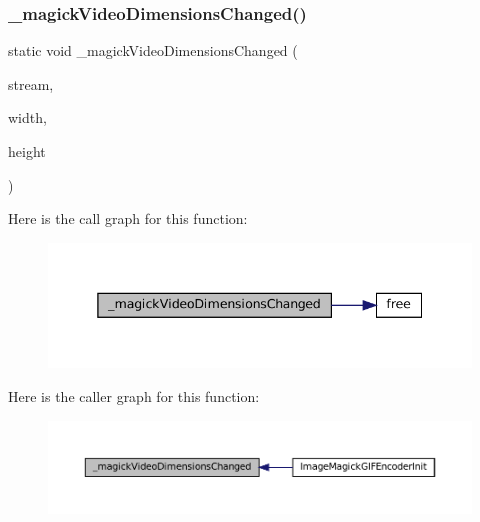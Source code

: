 \subsubsection{\texorpdfstring{\+\_\+magick\+Video\+Dimensions\+Changed()}{\_magickVideoDimensionsChanged()}}
{\footnotesize\ttfamily static void \+\_\+magick\+Video\+Dimensions\+Changed (\begin{DoxyParamCaption}\item[{struct m\+A\+V\+Stream $\ast$}]{stream,  }\item[{unsigned}]{width,  }\item[{unsigned}]{height }\end{DoxyParamCaption})\hspace{0.3cm}{\ttfamily [static]}}

Here is the call graph for this function\+:
\nopagebreak
\begin{figure}[H]
\begin{center}
\leavevmode
\includegraphics[width=338pt]{imagemagick-gif-encoder_8c_a22ece06be91b078780d4bf4306bc93e2_cgraph}
\end{center}
\end{figure}
Here is the caller graph for this function\+:
\nopagebreak
\begin{figure}[H]
\begin{center}
\leavevmode
\includegraphics[width=350pt]{imagemagick-gif-encoder_8c_a22ece06be91b078780d4bf4306bc93e2_icgraph}
\end{center}
\end{figure}
\mbox{\label{imagemagick-gif-encoder_8c_afbb1ff524c5364a4e5470189f8501204}} 
